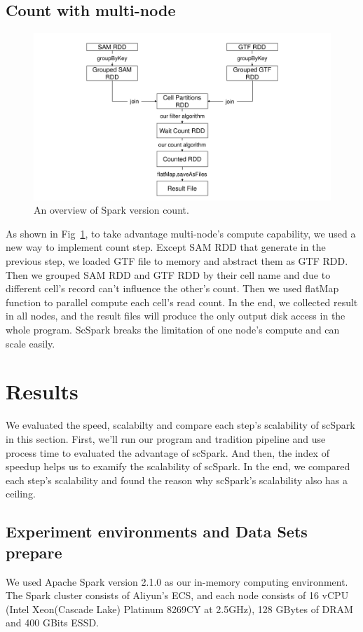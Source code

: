 \documentclass[runningheads]{llncs}
\begin{document}
\subsection{Count with multi-node}
\begin{figure}
  \includegraphics[width=\textwidth]{fig3.pdf}
  \caption{An overview of Spark version count.} \label{fig3}
\end{figure}
As shown in Fig~\ref{fig3}, to take advantage multi-node's compute capability, we used a new way to implement count step.
Except SAM RDD that generate in the previous step, we loaded GTF file to memory and abstract them as GTF RDD.
Then we grouped SAM RDD and GTF RDD by their cell name and due to different cell's record can't influence the other's count.
Then we used flatMap function to parallel compute each cell's read count.
In the end, we collected result in all nodes, and the result files will produce the only output disk access in the whole program.
ScSpark breaks the limitation of one node's compute and can scale easily.

\section{Results}
We evaluated the speed, scalabilty and compare each step's scalability of scSpark in this section.
First, we'll run our program and tradition pipeline and use process time to evaluated the advantage of scSpark.
And then, the index of speedup helps us to examify the scalability of scSpark.
In the end, we compared each step's scalability and found the reason why scSpark's scalability also has a ceiling.
\subsection{Experiment environments and Data Sets prepare}
We used Apache Spark version 2.1.0 as our in-memory computing environment.
The Spark cluster consists of Aliyun's ECS, and each node consists of 16 vCPU
(Intel Xeon(Cascade Lake) Platinum 8269CY at 2.5GHz), 128 GBytes of DRAM and 400 GBits ESSD.
\end{document}
